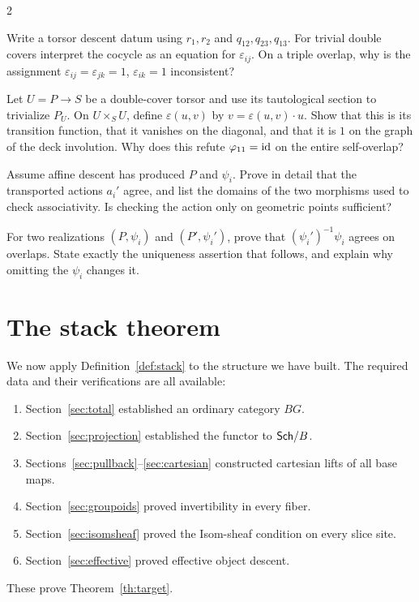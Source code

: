 \documentclass[12pt]{memoir}
\begin{document}
\begin{multicols}{2}
\begin{Ej}\label{ex:datum}
Write a torsor descent datum using $r_1,r_2$ and $q_{12},q_{23},q_{13}$.
For trivial double covers interpret the cocycle as an equation for
$\varepsilon_{ij}$. On a triple overlap, why is the assignment
$\varepsilon_{ij}=\varepsilon_{jk}=1$, $\varepsilon_{ik}=1$ inconsistent?
\end{Ej}
\begin{Ej}\label{ex:self}
Let $U=P\to S$ be a double-cover torsor and use its tautological
section to trivialize $P_U$. On $U\times_S U$, define
$\varepsilon(u,v)$ by $v=\varepsilon(u,v)\cdot u$.
Show that this is its transition function, that it vanishes on the
diagonal, and that it is $1$ on the graph of the deck involution.
Why does this refute $\varphi_{11}=\operatorname{id}$ on the entire self-overlap?
\end{Ej}
\begin{Ej}\label{ex:action}
Assume affine descent has produced $P$ and $\psi_i$. Prove in detail
that the transported actions $a_i'$ agree, and list the domains of the
two morphisms used to check associativity. Is checking the action only
on geometric points sufficient?
\end{Ej}
\begin{Ej}\label{ex:realization}
For two realizations $(P,\psi_i)$ and $(P',\psi_i')$, prove that
$(\psi_i')^{-1}\psi_i$ agrees on overlaps. State exactly the uniqueness
assertion that follows, and explain why omitting the $\psi_i$ changes it.
\end{Ej}

\section{The stack theorem}\label{sec:theorem}

We now apply Definition~\ref{def:stack} to the structure we have built.
The required data and their verifications are all available:
\begin{enumerate}[label=(\arabic*)]
\item Section~\ref{sec:total} established an ordinary category $BG$.
\item Section~\ref{sec:projection} established the functor to $\mathsf{Sch}/B$.
\item Sections~\ref{sec:pullback}--\ref{sec:cartesian} constructed
cartesian lifts of all base maps.
\item Section~\ref{sec:groupoids} proved invertibility in every fiber.
\item Section~\ref{sec:isomsheaf} proved the Isom-sheaf condition on
every slice site.
\item Section~\ref{sec:effective} proved effective object descent.
\end{enumerate}
These prove Theorem~\ref{th:target}.


\end{multicols}
\end{document}
